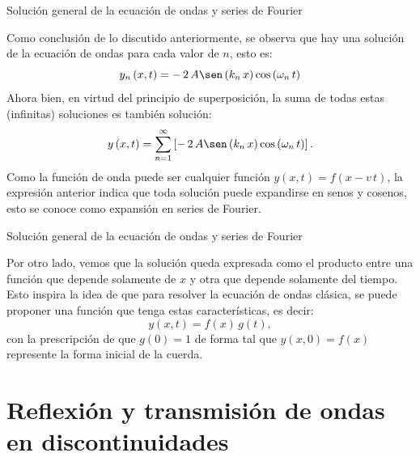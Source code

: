\documentclass[11pt,handout,aspectratio=1610]{beamer}
\begin{document}
\begin{frame}{Solución general de la ecuación de ondas y series de Fourier}

    Como conclusión de lo discutido anteriormente, se observa que hay una solución de la ecuación de ondas para cada valor de $n$, esto es: $$ y_n \left(x,t\right) = - \, 2 \, A \sen \left(k_n \, x\right) \cos \left(\omega_n \, t\right) $$ Ahora bien, en virtud del principio de superposición, la suma de todas estas (infinitas) soluciones es también solución: $$ y \left(x,t\right) = \sum_{n=1}^{\infty} \left[- \, 2 \, A \sen \left(k_n \, x\right) \cos \left(\omega_n \, t\right)\right]. $$ Como la función de onda puede ser cualquier función $y \left(x,t\right) = f \left(x - v \, t\right)$, la expresión anterior indica que toda solución puede expandirse en senos y cosenos, esto se conoce como expansión en series de Fourier.

\end{frame}

\begin{frame}{Solución general de la ecuación de ondas y series de Fourier}

    Por otro lado, vemos que la solución queda expresada como el producto entre una función que depende solamente de $x$ y otra que depende solamente del tiempo. Esto inspira la idea de que para resolver la ecuación de ondas clásica, se puede proponer una función que tenga estas características, es decir: $$ y \left(x,t\right) = f(x) \, g(t),$$ con la prescripción de que $g (0) = 1$ de forma tal que $y\left(x,0\right) = f(x)$ represente la forma inicial de la cuerda.

\end{frame}

\section{Reflexión y transmisión de ondas en discontinuidades}
\end{document}
